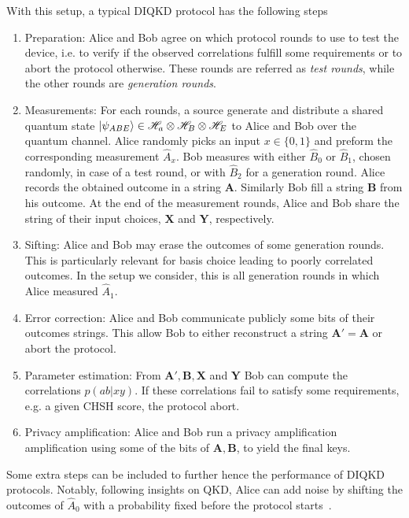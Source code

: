 With this setup, a typical DIQKD protocol has the following steps
\begin{enumerate}
		\item Preparation: Alice and Bob agree on which protocol rounds to use to test the device, i.e. to verify if the observed correlations fulfill some requirements or to abort the protocol otherwise. These rounds are referred as \textit{test rounds}, while the other rounds are \textit{generation rounds}.
		\item Measurements: For each rounds, a source generate and distribute a shared quantum state $\ket{\psi_{ABE}} \in \mathscr{H}_a \otimes \mathscr{H}_B \otimes \mathscr{H}_E$ to Alice and Bob over the quantum channel. Alice randomly picks an input $x\in\{0,1\}$ and preform the corresponding measurement $\hat{A}_x$. Bob measures with either $\hat{B}_0$ or $\hat{B}_1$, chosen randomly, in case of a test round, or with $\hat{B}_2$ for a generation round. Alice records the obtained outcome in a string
			$\mathbf{A}$. Similarly Bob fill a string $\mathbf{B}$ from his outcome. At the end of the measurement rounds, Alice and Bob share the string of their input choices, $\mathbf{X}$ and $\mathbf{Y}$, respectively.
		\item Sifting: Alice and Bob may erase the outcomes of some generation rounds. This is particularly relevant for basis choice leading to poorly correlated outcomes. In the setup we consider, this is all generation rounds in which Alice measured $\hat{A}_1$. 	
	\item Error correction: Alice and Bob communicate publicly some bits of their outcomes strings. This allow Bob to either reconstruct a string $\mathbf{A'}=\mathbf{A}$ or abort the protocol.
	\item Parameter estimation: From $\mathbf{A'},\mathbf{B},\mathbf{X}$ and $\mathbf{Y}$ Bob can compute the correlations $p(ab|xy)$. If these correlations fail to satisfy some requirements, e.g. a given CHSH score, the protocol abort. 
	\item Privacy amplification: Alice and Bob run a privacy amplification amplification using some of the bits of $\mathbf{A},\mathbf{B}$, to yield the final keys.
\end{enumerate}

Some extra steps can be included to further hence the performance of DIQKD protocols.
Notably, following insights on QKD, Alice can add noise by shifting the outcomes of $\hat{A}_0$ with a probability fixed before the protocol starts~\cite{Ho2020}. 

